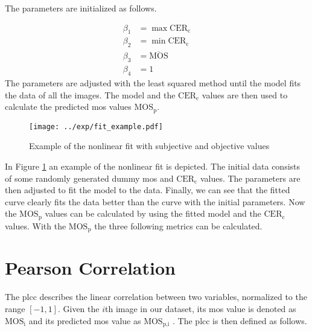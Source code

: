 
The parameters are initialized as follows.
 
\begin{equation}
    \begin{aligned}
        \beta_{1} &= \max{\text{CER}_{\text{c}}} \\
        \beta_{2} &= \min{\text{CER}_{\text{c}}} \\
        \beta_{3} &= \overline{\text{MOS}} \\
        \beta_{4} &= 1
    \end{aligned}
    \label{eq:nonlinear_init}
\end{equation}
The parameters are adjusted with the least squared method until the model fits the data of all the images.
The model and the $\text{CER}_{\text{c}}$ values are then used to calculate the predicted \gls{mos} values $\text{MOS}_{\text{p}}$.

\begin{figure}[h]
    \centering
    \texttt{[image: ../exp/fit\_example.pdf]}
    \caption{Example of the nonlinear fit with subjective and objective values}
    \label{fig:nonlinear_fit}
\end{figure}

In Figure \ref{fig:nonlinear_fit} an example of the nonlinear fit is depicted.
The initial data consists of some randomly generated dummy \gls{mos} and $\text{CER}_{\text{c}}$ values.
The parameters are then adjusted to fit the model to the data.
Finally, we can see that the fitted curve clearly fits the data better than the curve with the initial parameters.
Now the $\text{MOS}_{\text{p}}$ values can be calculated by using the fitted model and the $\text{CER}_{\text{c}}$ values.
With the $\text{MOS}_{\text{p}}$ the three following metrics \cite{iqa_survey_2021} can be calculated.

\section{Pearson Correlation}
\label{sec:pearson}

The \gls{plcc} \cite{pears_spear_2016} describes the linear correlation between two variables, normalized to the range $[-1, 1]$.
Given the $i$th image in our dataset, its \gls{mos} value is denoted as $\text{MOS}_{\text{i}}$ and its predicted \gls{mos} value as $\text{MOS}_{\text{p,i}}$ .
The \gls{plcc} is then defined as follows.

